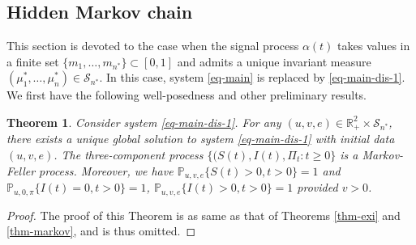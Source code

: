 \documentclass[12pt]{amsart}
\newcommand{\red}[1]{{\leavevmode\color{red}#1}}
\newtheorem{thm}{Theorem}[section]
\newtheorem {asp}{Assumption}[section]
\theoremstyle{remark}
\numberwithin{equation}{section}
\newcommand{\PP}{\mathbb{P}}
\newcommand{\R}{\mathbb{R}}
\numberwithin{equation}{section}
\newcommand{\1}{\boldsymbol{1}}
\begin{document}


\subsection{Hidden Markov chain}
\label{sec:dis}
This section is devoted to the case when the signal process $\alpha(t)$ takes values in a  finite set $\{m_1,\dots,m_{n^*}\}\subset[0,1]$ and admits a unique invariant measure $(\mu^*_1,\dots,\mu^*_n)\in\mathcal S_{n^*}$.
In this case,  system \eqref{eq-main} is replaced by \eqref{eq-main-dis-1}.
We first have the following well-posedness and other
preliminary results.

\begin{thm} Consider  system \eqref{eq-main-dis-1}.
		For any $(u, v,e)\in\R_+^2\times \mathcal S_{n^*}$, there exists a unique global solution
		to system \eqref{eq-main-dis-1} with  initial data $(u,v,e)$.
		The three-component process $\{(S(t), I(t),\Pi_t: t\geq0\}$
		is a Markov-Feller process.
		Moreover, we have
		$\PP_{u,v,e}\{S(t)>0, t>0\}=1$ and
		$\PP_{u,0,\pi}\{I(t)=0, t>0\}=1$,
		$\PP_{u,v,e}\{I(t)>0, t>0\}=1$ provided $v>0$.
\end{thm}

\begin{proof}
	The proof of this Theorem is as same as that of Theorems \ref{thm-exi} and \ref{thm-markov}, and is thus omitted.
\end{proof}
\end{document}
